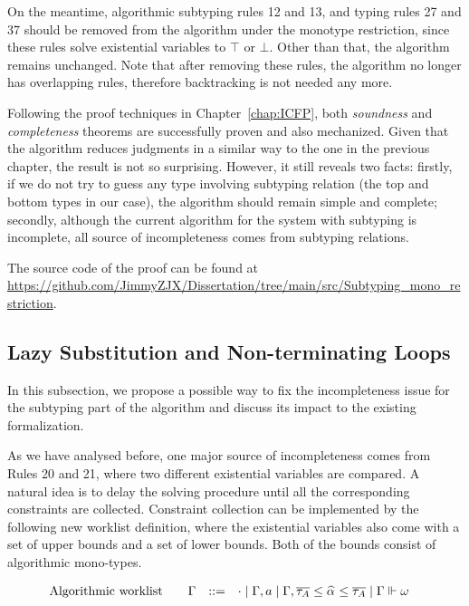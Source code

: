 On the meantime, algorithmic subtyping rules 12 and 13, and typing rules 27 and 37
should be removed from the algorithm under the monotype restriction,
since these rules solve existential variables to $\top$ or $\bot$.
Other than that, the algorithm remains unchanged.
Note that after removing these rules,
the algorithm no longer has overlapping rules,
therefore backtracking is not needed any more.

Following the proof techniques in Chapter~\ref{chap:ICFP},
both \emph{soundness} and \emph{completeness} theorems
are successfully proven and also mechanized.
Given that the algorithm reduces judgments in a similar way to the one in the previous chapter,
the result is not so surprising.
However, it still reveals two facts:
firstly, if we do not try to guess any type involving subtyping relation
(the top and bottom types in our case),
the algorithm should remain simple and complete;
secondly, although the current algorithm for the system with subtyping is incomplete,
all source of incompleteness comes from subtyping relations.

\begin{sloppypar}
The source code of the proof can be found at \url{https://github.com/JimmyZJX/Dissertation/tree/main/src/Subtyping_mono_restriction}.
\end{sloppypar}

\subsection{Lazy Substitution and Non-terminating Loops}\label{subsec:lazy_subst}
In this subsection, we propose a possible way to fix the incompleteness issue
for the subtyping part of the algorithm and discuss its impact to the existing formalization.

As we have analysed before,
one major source of incompleteness comes from Rules 20 and 21,
where two different existential variables are compared.
A natural idea is to delay the solving procedure until all the corresponding
constraints are collected.
Constraint collection can be implemented by the following new worklist definition,
where the existential variables also come with a set of upper bounds
and a set of lower bounds. Both of the bounds consist of algorithmic mono-types.

\begin{gather*}
    \begin{aligned}
        \text{Algorithmic worklist}\qquad&\Gm &::=&\quad \cdot \mid \Gm, a \mid \Gm, \overline{\tau_A} \le \al \le \overline{\tau_A} \mid \Gm \Vdash \jg
    \end{aligned}
\end{gather*}

